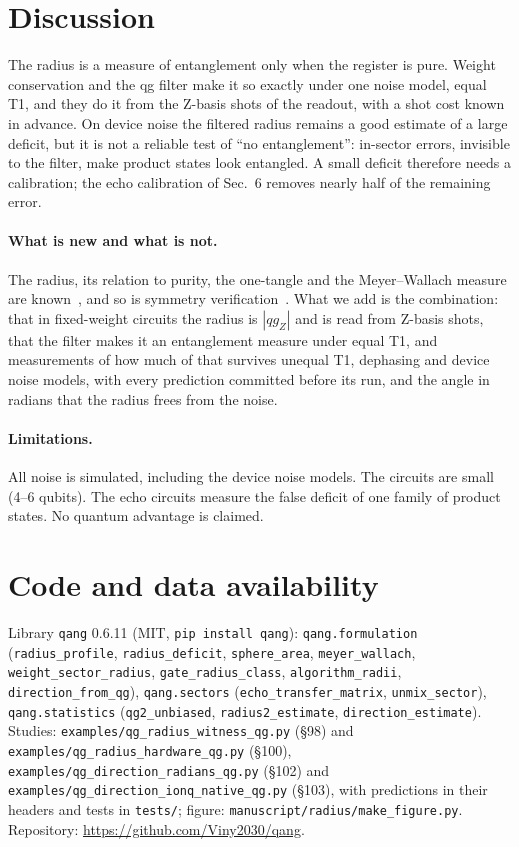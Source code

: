 \documentclass[11pt]{article}
\newcommand{\qZ}{qg_Z}
\begin{document}
\section{Discussion}

The radius is a measure of entanglement only when the register is pure. Weight conservation and the qg filter make it
so exactly under one noise model, equal T1, and they do it from the Z-basis shots of the readout, with a shot cost
known in advance. On device noise the filtered radius remains a good estimate of a large deficit, but it is not a
reliable test of ``no entanglement'': in-sector errors, invisible to the filter, make product states look entangled.
A small deficit therefore
needs a calibration; the echo calibration of Sec.~6 removes nearly half of the remaining error.

\paragraph{What is new and what is not.} The radius, its relation to purity, the one-tangle and the Meyer--Wallach
measure are known~\cite{wootters1998,coffman2000,meyer2002,brennen2003}, and so is symmetry
verification~\cite{bonetmonroig2018,mcardle2019}. What we add is the combination: that in fixed-weight circuits the
radius is $|\qZ|$ and is read from Z-basis shots, that the filter makes it an entanglement measure under equal T1,
and measurements of how much of that survives unequal T1, dephasing and device noise models, with every prediction
committed before its run, and the angle in radians that the radius frees from the noise.

\paragraph{Limitations.} All noise is simulated, including the device noise models. The circuits are small (4--6
qubits). The echo circuits measure the false deficit of one family of product states. No quantum advantage is claimed.

\section*{Code and data availability}
{\raggedright
Library \texttt{qang} 0.6.11 (MIT, \texttt{pip install qang}): \texttt{qang.formulation} (\texttt{radius\_profile},
\texttt{radius\_deficit}, \texttt{sphere\_area}, \texttt{meyer\_wallach}, \texttt{weight\_sector\_radius},
\texttt{gate\_radius\_class}, \texttt{algorithm\_radii}, \texttt{direction\_from\_qg}), \texttt{qang.sectors} (\texttt{echo\_transfer\_matrix},
\texttt{unmix\_sector}), \texttt{qang.statistics}
(\texttt{qg2\_unbiased}, \texttt{radius2\_estimate}, \texttt{direction\_estimate}). Studies: \texttt{examples/qg\_radius\_witness\_qg.py} (\S98) and
\texttt{examples/qg\_radius\_hardware\_qg.py} (\S100), \texttt{examples/qg\_direction\_radians\_qg.py} (\S102) and
\texttt{examples/qg\_direction\_ionq\_native\_qg.py} (\S103), with predictions in their headers and tests in \texttt{tests/};
figure: \texttt{manuscript/radius/make\_figure.py}. Repository: \url{https://github.com/Viny2030/qang}.\par}



\end{document}
